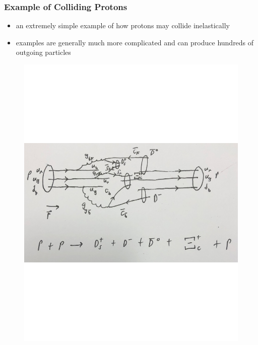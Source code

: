 \documentclass[
	11pt, %
]{beamer}
\begin{document}
\begin{frame}
\frametitle{Example of Colliding Protons}
	\begin{itemize}
		\item an extremely simple example of how protons may collide inelastically
		\item examples are generally much more complicated and can produce hundreds of outgoing particles
	\end{itemize}
	
\begin{figure}
	\vspace*{-2cm}
	 \hspace*{-5cm}
	\includegraphics[scale=.3]{proton_collision.pdf}
\end{figure}
\begin{figure}
	\vspace*{-8cm}
	 \hspace*{6cm}

\end{figure}
\end{frame}
\end{document}
